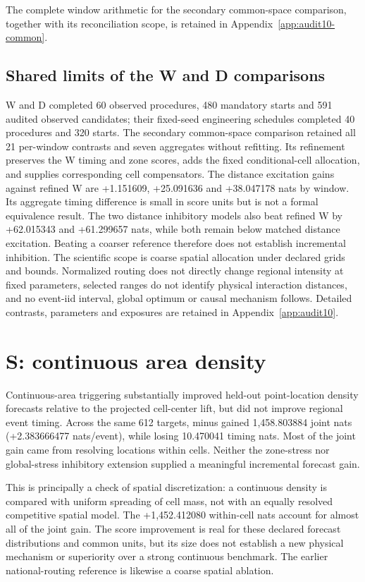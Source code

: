 The complete window arithmetic for the secondary common-space comparison, together with its reconciliation scope, is retained in Appendix~\ref{app:audit10-common}.

\subsection{Shared limits of the W and D comparisons}
W and D completed 60 observed procedures, 480 mandatory starts and 591 audited observed candidates; their fixed-seed engineering schedules completed 40 procedures and 320 starts. The secondary common-space comparison retained all 21 per-window contrasts and seven aggregates without refitting. Its refinement preserves the W timing and zone scores, adds the fixed conditional-cell allocation, and supplies corresponding cell compensators.
The distance excitation gains against refined W are +1.151609, +25.091636 and +38.047178 nats by window. Its aggregate timing difference is small in score units but is not a formal equivalence result. The two distance inhibitory models also beat refined W by +62.015343 and +61.299657 nats, while both remain below matched distance excitation. Beating a coarser reference therefore does not establish incremental inhibition.
The scientific scope is coarse spatial allocation under declared grids and bounds. Normalized routing does not directly change regional intensity at fixed parameters, selected ranges do not identify physical interaction distances, and no event-iid interval, global optimum or causal mechanism follows. Detailed contrasts, parameters and exposures are retained in Appendix~\ref{app:audit10}.

\section{S: continuous area density}

Continuous-area triggering substantially improved held-out point-location density forecasts relative to the projected cell-center lift, but did not improve regional event timing. Across the same 612 targets,  minus  gained 1,458.803884 joint nats (+2.383666477 nats/event), while losing 10.470041 timing nats. Most of the joint gain came from resolving locations within cells. Neither the zone-stress nor global-stress inhibitory extension supplied a meaningful incremental forecast gain.

This is principally a check of spatial discretization: a continuous density is compared with uniform spreading of cell mass, not with an equally resolved competitive spatial model. The +1,452.412080 within-cell nats account for almost all of the joint gain. The score improvement is real for these declared forecast distributions and common units, but its size does not establish a new physical mechanism or superiority over a strong continuous benchmark. The earlier national-routing reference is likewise a coarse spatial ablation.

